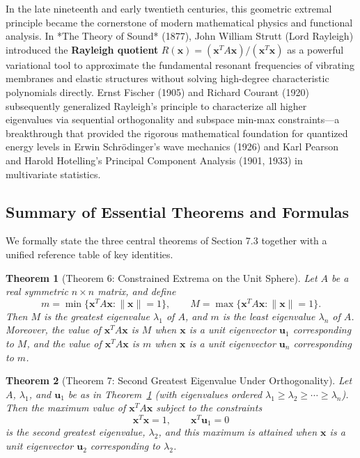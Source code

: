 \documentclass[11pt, letterpaper]{article}
\newtheorem{theorem}{Theorem}[section]
\theoremstyle{definition}
\theoremstyle{remark}
\begin{document}
In the late nineteenth and early twentieth centuries, this geometric extremal principle became the cornerstone of modern mathematical physics and functional analysis. In *The Theory of Sound* (1877), John William Strutt (Lord Rayleigh) introduced the \textbf{Rayleigh quotient} $R(\mathbf{x}) = (\mathbf{x}^T A \mathbf{x}) / (\mathbf{x}^T \mathbf{x})$ as a powerful variational tool to approximate the fundamental resonant frequencies of vibrating membranes and elastic structures without solving high-degree characteristic polynomials directly. Ernst Fischer (1905) and Richard Courant (1920) subsequently generalized Rayleigh's principle to characterize all higher eigenvalues via sequential orthogonality and subspace min-max constraints—a breakthrough that provided the rigorous mathematical foundation for quantized energy levels in Erwin Schr\"odinger's wave mechanics (1926) and Karl Pearson and Harold Hotelling's Principal Component Analysis (1901, 1933) in multivariate statistics.

\subsection{Summary of Essential Theorems and Formulas}

We formally state the three central theorems of Section 7.3 together with a unified reference table of key identities.

\begin{theorem}[Theorem 6: Constrained Extrema on the Unit Sphere]\label{thm:thm6}
Let $A$ be a real symmetric $n \times n$ matrix, and define
\[
m = \min \{\mathbf{x}^T A \mathbf{x} : \|\mathbf{x}\| = 1\}, \qquad M = \max \{\mathbf{x}^T A \mathbf{x} : \|\mathbf{x}\| = 1\}.
\]
Then $M$ is the greatest eigenvalue $\lambda_1$ of $A$, and $m$ is the least eigenvalue $\lambda_n$ of $A$. Moreover, the value of $\mathbf{x}^T A \mathbf{x}$ is $M$ when $\mathbf{x}$ is a unit eigenvector $\mathbf{u}_1$ corresponding to $M$, and the value of $\mathbf{x}^T A \mathbf{x}$ is $m$ when $\mathbf{x}$ is a unit eigenvector $\mathbf{u}_n$ corresponding to $m$.
\end{theorem}

\begin{theorem}[Theorem 7: Second Greatest Eigenvalue Under Orthogonality]\label{thm:thm7}
Let $A$, $\lambda_1$, and $\mathbf{u}_1$ be as in Theorem~\ref{thm:thm6} (with eigenvalues ordered $\lambda_1 \ge \lambda_2 \ge \cdots \ge \lambda_n$). Then the maximum value of $\mathbf{x}^T A \mathbf{x}$ subject to the constraints
\[
\mathbf{x}^T \mathbf{x} = 1, \qquad \mathbf{x}^T \mathbf{u}_1 = 0
\]
is the second greatest eigenvalue, $\lambda_2$, and this maximum is attained when $\mathbf{x}$ is a unit eigenvector $\mathbf{u}_2$ corresponding to $\lambda_2$.
\end{theorem}
\end{document}
